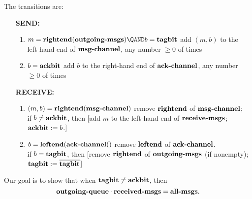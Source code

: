 The transitions are:
\begin{enumerate}
\item[\textbf{SEND:}]

\begin{enumerate}
\item
{}
{%
   $m = \text{\textbf{rightend}}(\text{\textbf{outgoing-msgs}}) \QAND
   b = \text{\textbf{tagbit}}$}
{%
   add $(m,b)$ to the left-hand end of $\text{\textbf{msg-channel}}$,
   any number $\geq 0$ of times}

\item
{}
{%
   $b = \text{\textbf{ackbit}}$}
{%
   add $b$ to the right-hand end of $\text{\textbf{ack-channel}}$,
   any number $\geq 0$ of times}
\end{enumerate}

\item[\textbf{RECEIVE:}]

\begin{enumerate}
\item
{}
 {%
   $(m,b) = \text{\textbf{rightend}}(\text{\textbf{msg-channel}})$}
{%
   remove $\text{\textbf{rightend}}$ of $\text{\textbf{msg-channel}}$;\\
   if $b \neq \text{\textbf{ackbit}}$, then
   [add $m$ to the left-hand end of $\text{\textbf{receive-msgs}}$;
   $\text{\textbf{ackbit}} := b$.]}

\item {}
{%
   $b = \text{\textbf{leftend}}(\text{\textbf{ack-channel}}()$}
{%
   remove $\text{\textbf{leftend}}$ of $\text{\textbf{ack-channel}}$.\\
   if $b = \text{\textbf{tagbit}}$, then
   [remove $\text{\textbf{rightend}}$ of $\text{\textbf{outgoing-msgs}}$ (if nonempty);
   $\text{\textbf{tagbit}} := \overline{\text{\textbf{tagbit}}}$]}
\end{enumerate}

\end{enumerate}

Our goal is to show that when $\text{\textbf{tagbit}} \neq
\text{\textbf{ackbit}}$, then\\
\begin{equation}\label{all-msgs-preserved}
\text{\textbf{outgoing-queue}}\cdot \text{\textbf{received-msgs}} =
\text{\textbf{all-msgs}}.
\end{equation}


